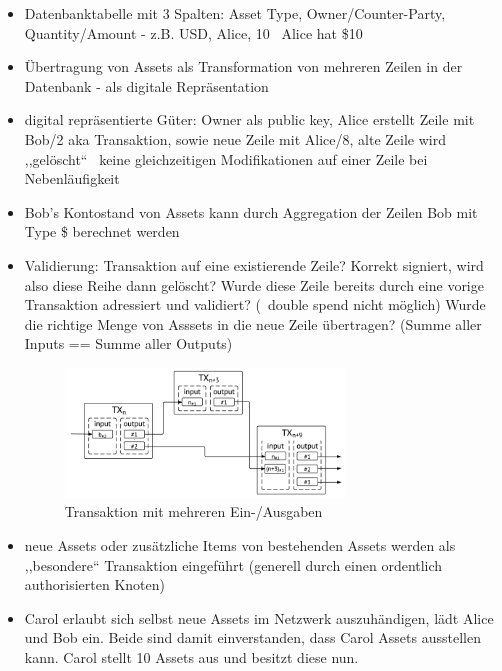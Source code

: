         \begin{itemize}
            \item Datenbanktabelle mit 3 Spalten: Asset Type, Owner/Counter-Party, Quantity/Amount - z.B. USD, Alice, 10 \textrightarrow\ Alice hat \$10
            \item Übertragung von Assets als Transformation von mehreren Zeilen in der Datenbank - als digitale Repräsentation
            \item digital repräsentierte Güter: Owner als public key, Alice erstellt Zeile mit Bob/2 aka Transaktion, sowie neue Zeile mit Alice/8, alte Zeile wird ,,gelöscht`` \textrightarrow\ keine gleichzeitigen Modifikationen auf einer Zeile bei Nebenläufigkeit
            \item Bob's Kontostand von Assets kann durch Aggregation der Zeilen Bob mit Type \$ berechnet werden
            \item Validierung: Transaktion auf eine existierende Zeile? Korrekt signiert, wird also diese Reihe dann gelöscht? Wurde diese Zeile bereits durch eine vorige Transaktion adressiert und validiert? (\textrightarrow\ double spend nicht möglich) Wurde die richtige Menge von Asssets in die neue Zeile übertragen? (Summe aller Inputs == Summe aller Outputs)
            \begin{figure}[H]
                \centering
                \includegraphics[width=0.7\textwidth]{paperNotes/chrisitidis201601.PNG}
                \caption{Transaktion mit mehreren Ein-/Ausgaben}
                \label{figure:transaction}
            \end{figure}
            \item neue Assets oder zusätzliche Items von bestehenden Assets werden als ,,besondere`` Transaktion eingeführt (generell durch einen ordentlich authorisierten Knoten)
            \item Carol erlaubt sich selbst neue Assets im Netzwerk auszuhändigen, lädt Alice und Bob ein. Beide sind damit einverstanden, dass Carol Assets ausstellen kann. Carol stellt 10 Assets aus und besitzt diese nun.
        \end{itemize}
        
